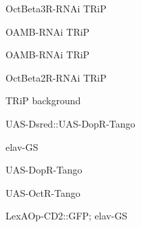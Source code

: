 \documentclass[17pt]{extarticle}
\begin{document}
\footnotesize
\newpage\vspace*{-0.15cm}
\begin{footnotesize}
OctBeta3R-RNAi TRiP \\[0.5em]
\end{footnotesize}
\footnotesize
\newpage\vspace*{-0.15cm}
\begin{normalsize}
OAMB-RNAi TRiP \\[0.5em]
\end{normalsize}
\footnotesize
\newpage\vspace*{-0.15cm}
\begin{normalsize}
OAMB-RNAi TRiP \\[0.5em]
\end{normalsize}
\footnotesize
\newpage\vspace*{-0.15cm}
\begin{footnotesize}
OctBeta2R-RNAi TRiP \\[0.5em]
\end{footnotesize}
\footnotesize
\newpage\vspace*{-0.15cm}
\begin{normalsize}
TRiP background \\[0.5em]
\end{normalsize}
\footnotesize
\newpage\vspace*{-0.15cm}
\begin{footnotesize}
UAS-Dsred::UAS-DopR-Tango \\[0.5em]
\end{footnotesize}
\footnotesize
\newpage\vspace*{-0.15cm}
\begin{large}
elav-GS \\[0.5em]
\end{large}
\footnotesize
\newpage\vspace*{-0.15cm}
\begin{normalsize}
UAS-DopR-Tango \\[0.5em]
\end{normalsize}
\footnotesize
\newpage\vspace*{-0.15cm}
\begin{normalsize}
UAS-OctR-Tango \\[0.5em]
\end{normalsize}
\footnotesize
\newpage\vspace*{-0.15cm}
\begin{footnotesize}
LexAOp-CD2::GFP; elav-GS \\[0.5em]
\end{footnotesize}
\end{document}
